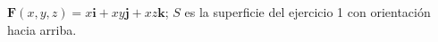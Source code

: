 \item $\mathbf{F}(x,y,z) = x\mathbf{i} + xy\mathbf{j} + xz\mathbf{k}$; $S$ es la superficie del ejercicio 1 con orientación hacia arriba.
